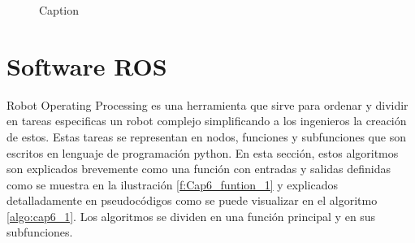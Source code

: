 \begin{center}
\begin{figure}[h!]
    \caption{Caption}
    \label{fig:cap6_intro_2}
    \end{figure}
    \end{center}

     \newpage


\section{Software ROS}

    Robot Operating Processing es una herramienta que sirve para ordenar y dividir en tareas especificas un robot complejo simplificando a los ingenieros la creación de estos. Estas tareas se representan en nodos, funciones y subfunciones que son escritos en lenguaje de programación python. En esta sección, estos algoritmos son explicados brevemente como una función con entradas y salidas definidas como se muestra en la ilustración \ref{f:Cap6_funtion_1} y explicados detalladamente en pseudocódigos como se puede visualizar en el algoritmo \ref{algo:cap6_1}. Los algoritmos se dividen en una función principal y en sus subfunciones.
    
